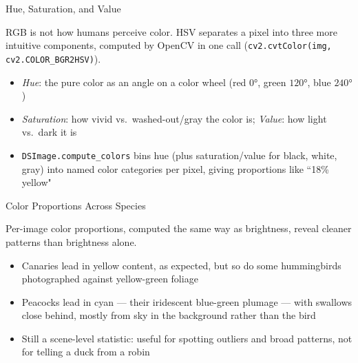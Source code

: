 \documentclass[8pt,aspectratio=169]{beamer}
\begin{document}
\begin{textframe}{Hue, Saturation, and Value}

RGB is not how humans perceive color. HSV separates a pixel into three more intuitive components, computed by OpenCV in one call (\texttt{cv2.cvtColor(img, cv2.COLOR\_BGR2HSV)}).

\begin{itemize}
\item \textit{Hue}: the pure color as an angle on a color wheel (red $0°$, green $120°$, blue $240°$)
\item \textit{Saturation}: how vivid vs.\ washed-out/gray the color is; \textit{Value}: how light vs.\ dark it is
\item \texttt{DSImage.compute\_colors} bins hue (plus saturation/value for black, white, gray) into named color categories per pixel, giving proportions like ``18\% yellow"
\end{itemize}

\end{textframe}

\begin{textframe}{Color Proportions Across Species}

Per-image color proportions, computed the same way as brightness, reveal cleaner patterns than brightness alone.

\begin{itemize}
\item Canaries lead in yellow content, as expected, but so do some hummingbirds photographed against yellow-green foliage
\item Peacocks lead in cyan --- their iridescent blue-green plumage --- with swallows close behind, mostly from sky in the background rather than the bird
\item Still a scene-level statistic: useful for spotting outliers and broad patterns, not for telling a duck from a robin
\end{itemize}

\end{textframe}
\end{document}
